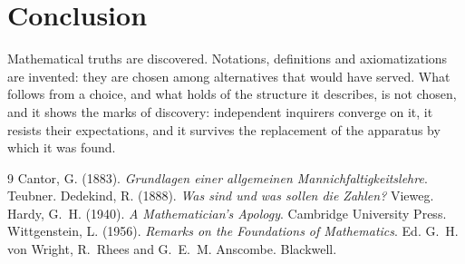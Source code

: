 \documentclass{situationist-preprint}
\begin{document}
\section{Conclusion}

Mathematical truths are discovered. Notations, definitions and axiomatizations are invented: they are chosen among alternatives that would have served. What follows from a choice, and what holds of the structure it describes, is not chosen, and it shows the marks of discovery: independent inquirers converge on it, it resists their expectations, and it survives the replacement of the apparatus by which it was found.

\begin{thebibliography}{9}\small
{} Cantor, G. (1883). \emph{Grundlagen einer allgemeinen Mannichfaltigkeitslehre}. Teubner.
 Dedekind, R. (1888). \emph{Was sind und was sollen die Zahlen?} Vieweg.
 Hardy, G.~H. (1940). \emph{A Mathematician's Apology}. Cambridge University Press.
 Wittgenstein, L. (1956). \emph{Remarks on the Foundations of Mathematics}. Ed. G.~H. von Wright, R.~Rhees and G.~E.~M. Anscombe. Blackwell.
\end{thebibliography}
\end{document}
